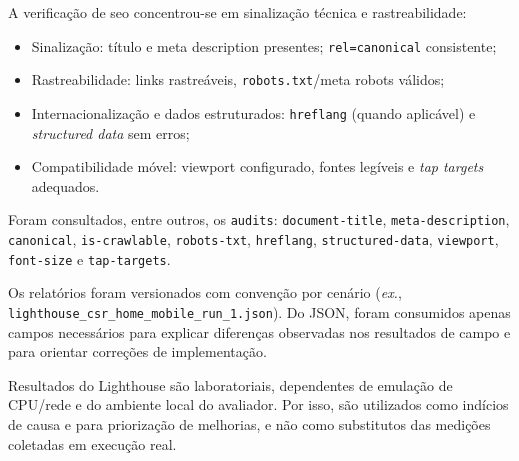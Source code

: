 A verificação de \acrshort{seo} concentrou-se em sinalização técnica e rastreabilidade:
\begin{itemize}
  \item Sinalização: título e meta description presentes; \texttt{rel=canonical} consistente;
  \item Rastreabilidade: links rastreáveis, \texttt{robots.txt}/meta robots válidos;
  \item Internacionalização e dados estruturados: \texttt{hreflang} (quando aplicável) e \textit{structured data} sem erros;
  \item Compatibilidade móvel: viewport configurado, fontes legíveis e \textit{tap targets} adequados.
\end{itemize}

Foram consultados, entre outros, os \texttt{audits}: \texttt{document-title}, \texttt{meta-description}, \texttt{canonical}, \texttt{is-crawlable}, \texttt{robots-txt}, \texttt{hreflang}, \texttt{structured-data}, \texttt{viewport}, \texttt{font-size} e \texttt{tap-targets}.

Os relatórios foram versionados com convenção por cenário (\textit{ex.}, \texttt{lighthouse\_csr\_home\_mobile\_run\_1.json}). Do JSON, foram consumidos apenas campos necessários para explicar diferenças observadas nos resultados de campo e para orientar correções de implementação.

Resultados do Lighthouse são laboratoriais, dependentes de emulação de CPU/rede e do ambiente local do avaliador. Por isso, são utilizados como indícios de causa e para priorização de melhorias, e não como substitutos das medições coletadas em execução real.